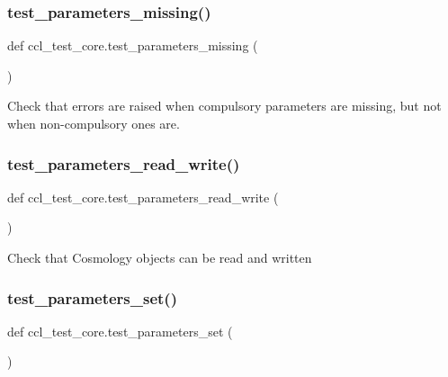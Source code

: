 \subsubsection{\texorpdfstring{test\+\_\+parameters\+\_\+missing()}{test\_parameters\_missing()}}
{\footnotesize\ttfamily def ccl\+\_\+test\+\_\+core.\+test\+\_\+parameters\+\_\+missing (\begin{DoxyParamCaption}{ }\end{DoxyParamCaption})}

\begin{DoxyVerb}Check that errors are raised when compulsory parameters are missing, but
not when non-compulsory ones are.
\end{DoxyVerb}
 \mbox{\label{namespaceccl__test__core_a924e671fa5314cb9250c4e9205105870}} 
\subsubsection{\texorpdfstring{test\+\_\+parameters\+\_\+read\+\_\+write()}{test\_parameters\_read\_write()}}
{\footnotesize\ttfamily def ccl\+\_\+test\+\_\+core.\+test\+\_\+parameters\+\_\+read\+\_\+write (\begin{DoxyParamCaption}{ }\end{DoxyParamCaption})}

\begin{DoxyVerb}Check that Cosmology objects can be read and written\end{DoxyVerb}
 \mbox{\label{namespaceccl__test__core_a6d316a5e78c5a180dfc4b6887fa0b9f8}} 
\subsubsection{\texorpdfstring{test\+\_\+parameters\+\_\+set()}{test\_parameters\_set()}}
{\footnotesize\ttfamily def ccl\+\_\+test\+\_\+core.\+test\+\_\+parameters\+\_\+set (\begin{DoxyParamCaption}{ }\end{DoxyParamCaption})}

